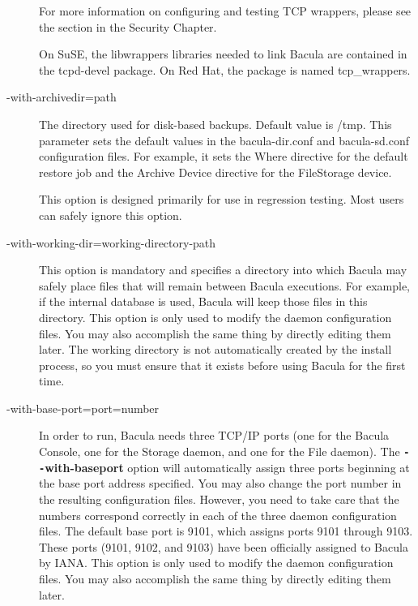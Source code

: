 \begin{description}
   For more information on configuring and testing TCP wrappers, please  see the 
     section
   in the Security Chapter.  

   On SuSE, the libwrappers libraries needed to link Bacula are
   contained in the tcpd-devel package. On Red Hat, the package is named
   tcp\_wrappers.

\item [ {-}{\-}with-archivedir=\lt{}path\gt{} ]
   The directory used for disk-based backups.  Default value is /tmp.
   This parameter sets the default values in the bacula-dir.conf and bacula-sd.conf
   configuration files.  For example, it sets the Where directive for the
   default restore job and the Archive Device directive for the FileStorage
   device.

   This option is designed primarily for use in regression testing.
   Most users can safely ignore this option.

\item [ {-}{\-}with-working-dir=\lt{}working-directory-path\gt{} ]
   This option is mandatory and specifies a directory  into which Bacula may
   safely place files that  will remain between Bacula executions. For example, 
   if the internal database is used, Bacula will keep  those files in this
   directory.  This option is only used to modify the daemon  configuration
   files. You may also accomplish the same  thing by directly editing them later.
   The working directory  is not automatically created by the install process, so
   you  must ensure that it exists before using Bacula for the  first time. 

\item [ {-}{\-}with-base-port=\lt{}port=number\gt{}]
   In order to run,  Bacula needs three TCP/IP ports (one for the Bacula 
   Console, one for the Storage daemon, and one for the File daemon).  The {\bf
   \verb:--:with-baseport} option will automatically assign three  ports beginning at
   the base port address specified. You may  also change the port number in the
   resulting configuration  files. However, you need to take care that the
   numbers  correspond correctly in each of the three daemon configuration 
   files. The default base port is 9101, which assigns ports 9101  through 9103.
   These ports (9101, 9102, and 9103) have been  officially assigned to Bacula by
   IANA.  This option is only used  to modify the daemon configuration files. You
   may also accomplish  the same thing by directly editing them later. 


\end{description}
